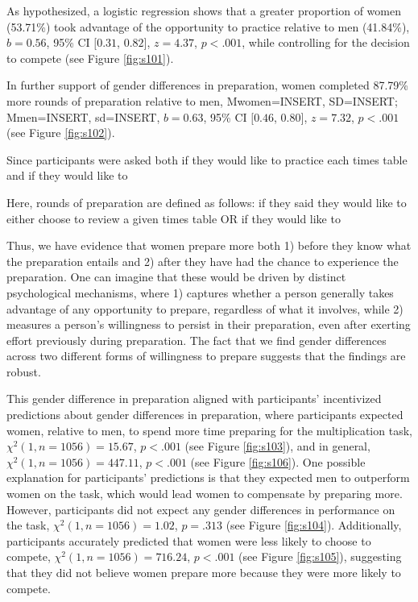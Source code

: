 \documentclass[a4paper, nobind]{templates/ociamthesis}
\begin{document}
As hypothesized, a logistic regression shows that a greater proportion of women (53.71\%) took advantage of the opportunity to practice relative to men (41.84\%), \(b = 0.56\), 95\% CI \([0.31\), \(0.82]\), \(z = 4.37\), \(p < .001\), while controlling for the decision to compete (see Figure \ref{fig:s101}).

In further support of gender differences in preparation, women completed 87.79\% more rounds of preparation relative to men, Mwomen=INSERT, SD=INSERT; Mmen=INSERT, sd=INSERT, \(b = 0.63\), 95\% CI \([0.46\), \(0.80]\), \(z = 7.32\), \(p < .001\) (see Figure \ref{fig:s102}).

Since participants were asked both if they would like to practice each times table and if they would like to

Here, rounds of preparation are defined as follows: if they said they would like to either choose to review a given times table OR if they would like to

Thus, we have evidence that women prepare more both 1) before they know what the preparation entails and 2) after they have had the chance to experience the preparation. One can imagine that these would be driven by distinct psychological mechanisms, where 1) captures whether a person generally takes advantage of any opportunity to prepare, regardless of what it involves, while 2) measures a person's willingness to persist in their preparation, even after exerting effort previously during preparation. The fact that we find gender differences across two different forms of willingness to prepare suggests that the findings are robust.

This gender difference in preparation aligned with participants' incentivized predictions about gender differences in preparation, where participants expected women, relative to men, to spend more time preparing for the multiplication task, \(\chi^2(1, n = 1056) = 15.67\), \(p < .001\) (see Figure \ref{fig:s103}), and in general, \(\chi^2(1, n = 1056) = 447.11\), \(p < .001\) (see Figure \ref{fig:s106}). One possible explanation for participants' predictions is that they expected men to outperform women on the task, which would lead women to compensate by preparing more. However, participants did not expect any gender differences in performance on the task, \(\chi^2(1, n = 1056) = 1.02\), \(p = .313\) (see Figure \ref{fig:s104}). Additionally, participants accurately predicted that women were less likely to choose to compete, \(\chi^2(1, n = 1056) = 716.24\), \(p < .001\) (see Figure \ref{fig:s105}), suggesting that they did not believe women prepare more because they were more likely to compete.
\end{document}
